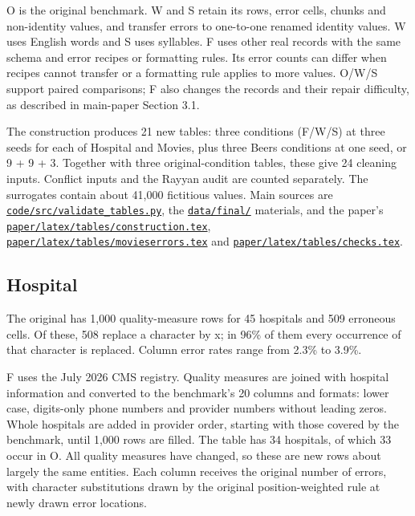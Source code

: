 \documentclass[10pt,a4paper]{article}
\begin{document}
O is the original benchmark. W and S retain its rows, error cells, chunks and non-identity values, and transfer errors to one-to-one renamed identity values. W uses English words and S uses syllables. F uses other real records with the same schema and error recipes or formatting rules. Its error counts can differ when recipes cannot transfer or a formatting rule applies to more values. O/W/S support paired comparisons; F also changes the records and their repair difficulty, as described in main-paper Section 3.1.

The construction produces 21 new tables: three conditions (F/W/S) at three seeds for each of Hospital and Movies, plus three Beers conditions at one seed, or 9 + 9 + 3. Together with three original-condition tables, these give 24 cleaning inputs. Conflict inputs and the Rayyan audit are counted separately. The surrogates contain about 41,000 fictitious values. Main sources are \href{https://github.com/hinsonver/CoRe-Benchmark/blob/main/code/src/validate_tables.py}{\nolinkurl{code/src/validate_tables.py}}, the \href{https://github.com/hinsonver/CoRe-Benchmark/blob/main/data/final/}{\nolinkurl{data/final/}} materials, and the paper's \href{https://github.com/hinsonver/CoRe-Benchmark/blob/main/paper/latex/tables/construction.tex}{\nolinkurl{paper/latex/tables/construction.tex}}, \href{https://github.com/hinsonver/CoRe-Benchmark/blob/main/paper/latex/tables/movieserrors.tex}{\nolinkurl{paper/latex/tables/movieserrors.tex}} and \href{https://github.com/hinsonver/CoRe-Benchmark/blob/main/paper/latex/tables/checks.tex}{\nolinkurl{paper/latex/tables/checks.tex}}.

\subsection{Hospital}

The original has 1,000 quality-measure rows for 45 hospitals and 509 erroneous cells. Of these, 508 replace a character by {\ttfamily\small x}; in 96\% of them every occurrence of that character is replaced. Column error rates range from 2.3\% to 3.9\%.

F uses the July 2026 CMS registry. Quality measures are joined with hospital information and converted to the benchmark's 20 columns and formats: lower case, digits-only phone numbers and provider numbers without leading zeros. Whole hospitals are added in provider order, starting with those covered by the benchmark, until 1,000 rows are filled. The table has 34 hospitals, of which 33 occur in O. All quality measures have changed, so these are new rows about largely the same entities. Each column receives the original number of errors, with character substitutions drawn by the original position-weighted rule at newly drawn error locations.
\end{document}
